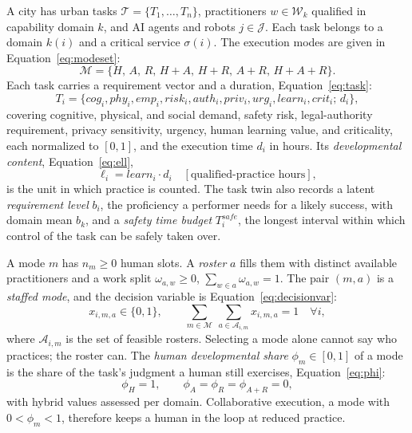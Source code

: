 \documentclass[utf8]{FrontiersinHarvard}
\begin{document}
	A city has urban tasks $\mathcal{T}=\{T_1,\ldots,T_n\}$, practitioners $w\in\mathcal{W}_k$ qualified in capability domain $k$, and AI agents and robots $j\in\mathcal{J}$. Each task belongs to a domain $k(i)$ and a critical service $\sigma(i)$. The execution modes are given in Equation~\eqref{eq:modeset}:
	\begin{equation}
		\mathcal{M}=\{H,\,A,\,R,\,H\!+\!A,\,H\!+\!R,\,A\!+\!R,\,H\!+\!A\!+\!R\}.
		\label{eq:modeset}
	\end{equation}
	Each task carries a requirement vector and a duration, Equation~\eqref{eq:task}:
	\begin{equation}
		T_i =
		\{cog_i, phy_i, emp_i, risk_i, auth_i, priv_i,
		urg_i, learn_i, crit_i;\, d_i\},
		\label{eq:task}
	\end{equation}
	covering cognitive, physical, and social demand, safety risk, legal-authority requirement, privacy sensitivity, urgency, human learning value, and criticality, each normalized to $[0,1]$, and the execution time $d_i$ in hours. Its \textit{developmental content}, Equation~\eqref{eq:ell},
	\begin{equation}
		\ell_i = learn_i \cdot d_i \quad [\text{qualified-practice hours}],
		\label{eq:ell}
	\end{equation}
	is the unit in which practice is counted. The task twin also records a latent \textit{requirement level} $b_i$, the proficiency a performer needs for a likely success, with domain mean $b_k$, and a \textit{safety time budget} $T^{safe}_i$, the longest interval within which control of the task can be safely taken over.

	A mode $m$ has $n_m\ge 0$ human slots. A \textit{roster} $a$ fills them with distinct available practitioners and a work split $\omega_{a,w}\ge 0$, $\sum_{w\in a}\omega_{a,w}=1$. The pair $(m,a)$ is a \textit{staffed mode}, and the decision variable is Equation~\eqref{eq:decisionvar}:
	\begin{equation}
		x_{i,m,a}\in\{0,1\},\qquad
		\sum_{m\in\mathcal{M}}\ \sum_{a\in\mathcal{A}_{i,m}} x_{i,m,a}=1 \quad \forall i,
		\label{eq:decisionvar}
	\end{equation}
	where $\mathcal{A}_{i,m}$ is the set of feasible rosters. Selecting a mode alone cannot say who practices; the roster can. The \textit{human developmental share} $\phi_m\in[0,1]$ of a mode is the share of the task's judgment a human still exercises, Equation~\eqref{eq:phi}:
	\begin{equation}
		\phi_H = 1,\qquad \phi_A = \phi_R = \phi_{A+R} = 0,
		\label{eq:phi}
	\end{equation}
	with hybrid values assessed per domain. Collaborative execution, a mode with $0<\phi_m<1$, therefore keeps a human in the loop at reduced practice.
\end{document}
